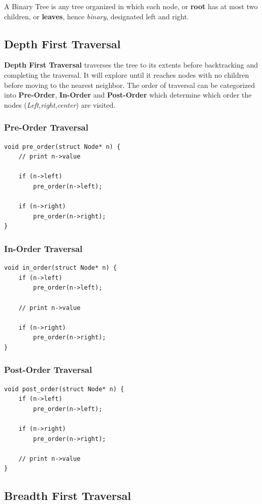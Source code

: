 \documentclass[11pt]{article}
\begin{document}
A Binary Tree is any tree organized in which each node, or \textbf{root} has at most two children, or \textbf{leaves}, hence \textit{binary}, designated left and right. 

\subsection{Depth First Traversal}

\textbf{Depth First Traversal} traverses the tree to its extents before backtracking and completing the traversal. It will explore until it reaches nodes with no children before moving to the nearest neighbor. The order of traversal can be categorized into \textbf{Pre-Order}, \textbf{In-Order} and \textbf{Post-Order} which determine which order the nodes (\textit{Left},\textit{right},\textit{center}) are visited.

\subsubsection{Pre-Order Traversal}
\begin{lstlisting}
void pre_order(struct Node* n) {
    // print n->value

    if (n->left)
        pre_order(n->left);

    if (n->right)
        pre_order(n->right);
}
\end{lstlisting}
\subsubsection{In-Order Traversal}
\begin{lstlisting}
void in_order(struct Node* n) {
    if (n->left)
        pre_order(n->left);

    // print n->value

    if (n->right)
        pre_order(n->right);
}
\end{lstlisting}
\subsubsection{Post-Order Traversal}
\begin{lstlisting}
void post_order(struct Node* n) {
    if (n->left)
        pre_order(n->left);

    if (n->right)
        pre_order(n->right);

    // print n->value
}
\end{lstlisting}
\subsection{Breadth First Traversal}
\end{document}

